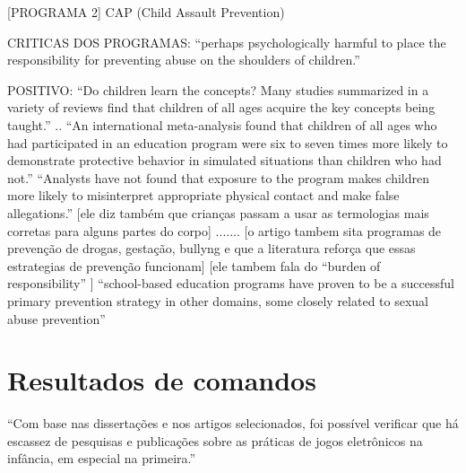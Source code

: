 [PROGRAMA 2] CAP (Child Assault Prevention) \cite{finkelhor2009prevention}

CRITICAS DOS PROGRAMAS: ``perhaps psychologically harmful to place the responsibility for preventing abuse on the shoulders of children.''\cite{finkelhor2009prevention}

POSITIVO: ``Do children learn the concepts? Many studies summarized in a variety of reviews find that children of all ages acquire the key concepts being taught.''\cite{finkelhor2009prevention} .. ``An international meta-analysis found that children of all ages who had participated in an education program were six to seven times more likely to demonstrate protective behavior in simulated situations than children who had not.'' ``Analysts have not found that exposure to the program makes children more likely to misinterpret appropriate physical contact and make false allegations.'' [ele diz também que crianças passam a usar as termologias mais corretas para alguns partes do corpo]   ....... [o artigo tambem sita programas de prevenção de drogas, gestação, bullyng e que a literatura reforça que essas estrategias de prevenção funcionam] [ele tambem fala do “burden of responsibility” ] ``school-based education programs have proven to be a successful primary prevention strategy in other domains, some closely related to sexual abuse prevention'' \cite{finkelhor2009prevention}
 

















\chapter{Resultados de comandos}\label{cap_exemplos}

``Com base nas dissertações e nos artigos selecionados, foi possível verificar que há escassez de pesquisas e publicações sobre as práticas de jogos eletrônicos na infância, em especial na primeira.''  \cite{cotonhoto2016pratica}
